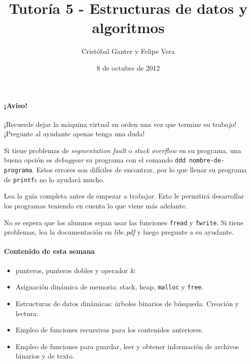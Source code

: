 \documentclass[a4paper,10pt]{article}
\title{Tutoría 5 - Estructuras de datos y algoritmos}
\author{Cristóbal Ganter y Felipe Vera}
\date{8 de octubre de 2012}
\begin{document}
\maketitle

\paragraph{¡Aviso!} ¡Recuerde dejar la máquina virtual en orden una vez que termine su trabajo!
¡Pregunte al ayudante apenas tenga una duda!

Si tiene problemas de \textit{segmentation fault} o \textit{stack overflow} en su programa, una buena opción es \textit{debuggear} su programa con el comando \texttt{ddd nombre-de-programa}.
Estos errores son difíciles de encontrar, por lo que llenar su programa de \texttt{printf}s no lo ayudará mucho.

Lea la guía completa antes de empezar a trabajar. Esto le permitirá desarrollar los programas teniendo en cuenta lo que viene más adelante.

No se espera que los alumnos sepan usar las funciones \texttt{fread} y \texttt{fwrite}. Si tiene problemas, lea la documentación en \textit{libc.pdf} y luego pregunte a su ayudante.

\paragraph{Contenido de esta semana}
\begin{itemize}
  \item punteros, punteros dobles y operador \&
  \item Asignación dinámica de memoria: stack, heap, \texttt{malloc} y \texttt{free}.
  \item Estructuras de datos dinámicas: árboles binarios de búsqueda. Creación y lectura.
  \item Empleo de funciones recursivas para los contenidos anteriores.
	\item Empleo de funciones para guardar, leer y obtener información de archivos binarios y de texto.
\end{itemize}
\end{document}
